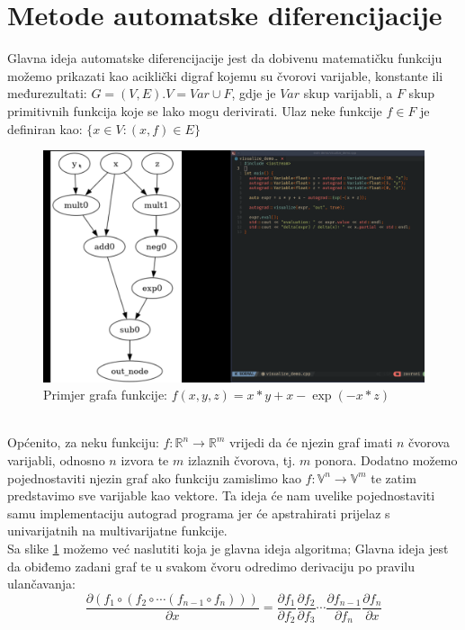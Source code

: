 \documentclass[zavrsnirad]{fer}
\begin{document}
\section{Metode automatske diferencijacije}
Glavna ideja automatske diferencijacije jest da dobivenu matematičku funkciju možemo prikazati kao aciklički digraf kojemu su čvorovi varijable, konstante ili međurezultati: $G = (V, E). V = Var \cup F$, gdje je $Var$ skup varijabli, a $F$ skup primitivnih funkcija koje se lako mogu derivirati. Ulaz neke funkcije $f \in F$ je definiran kao: $\{x \in V \colon (x, f) \in E\}$
\begin{figure}[h]
  \centering
  \includegraphics[width=0.7\linewidth]{../../pics/demo1.png}
  \caption{Primjer grafa funkcije: $f(x, y, z) = x * y + x - \exp(-x*z)$}
  \label{slk:graf_funkcije1}
\end{figure}
\\
Općenito, za neku funkciju: $f\colon \mathbb{R}^n \rightarrow \mathbb{R}^m$ vrijedi da će njezin graf imati $n$ čvorova varijabli, odnosno $n$ izvora te $m$ izlaznih čvorova, tj. $m$ ponora. Dodatno možemo pojednostaviti njezin graf ako funkciju zamislimo kao $f\colon \mathbb{V}^n \rightarrow \mathbb{V}^m$ te zatim predstavimo sve varijable kao vektore. Ta ideja će nam uvelike pojednostaviti samu implementaciju autograd programa jer će apstrahirati prijelaz s univarijatnih na multivarijatne funkcije.
\\
Sa slike \ref{slk:graf_funkcije1} možemo već naslutiti koja je glavna ideja algoritma; Glavna ideja jest da obiđemo zadani graf te u svakom čvoru odredimo derivaciju po pravilu ulančavanja:
\begin{equation}
  \frac{\partial (f_1 \circ (f_2 \circ \dotsb (f_{n-1} \circ f_n)))}{\partial x}
    = \frac{\partial f_1}{\partial f_2} \frac{\partial f_2}{\partial f_3}
      \dotsb
      \frac{\partial f_{n-1}}{\partial f_n} \frac{\partial f_n}{\partial x}
\end{equation}
\\
\end{document}
